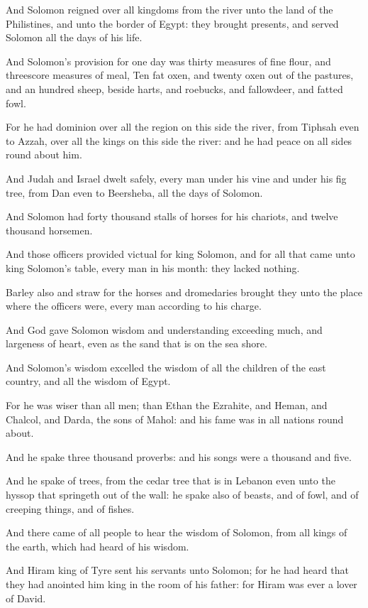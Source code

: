 \Verse And Solomon reigned over all kingdoms from the river unto the land of the Philistines, and unto the border of Egypt: they brought presents, and served Solomon all the days of his life.

\Verse And Solomon's provision for one day was thirty measures of fine flour, and threescore measures of meal, \Verse Ten fat oxen, and twenty oxen out of the pastures, and an hundred sheep, beside harts, and roebucks, and fallowdeer, and fatted fowl.

\Verse For he had dominion over all the region on this side the river, from Tiphsah even to Azzah, over all the kings on this side the river: and he had peace on all sides round about him.

\Verse And Judah and Israel dwelt safely, every man under his vine and under his fig tree, from Dan even to Beersheba, all the days of Solomon.

\Verse And Solomon had forty thousand stalls of horses for his chariots, and twelve thousand horsemen.

\Verse And those officers provided victual for king Solomon, and for all that came unto king Solomon's table, every man in his month: they lacked nothing.

\Verse Barley also and straw for the horses and dromedaries brought they unto the place where the officers were, every man according to his charge.

\Verse And God gave Solomon wisdom and understanding exceeding much, and largeness of heart, even as the sand that is on the sea shore.

\Verse And Solomon's wisdom excelled the wisdom of all the children of the east country, and all the wisdom of Egypt.

\Verse For he was wiser than all men; than Ethan the Ezrahite, and Heman, and Chalcol, and Darda, the sons of Mahol: and his fame was in all nations round about.

\Verse And he spake three thousand proverbs: and his songs were a thousand and five.

\Verse And he spake of trees, from the cedar tree that is in Lebanon even unto the hyssop that springeth out of the wall: he spake also of beasts, and of fowl, and of creeping things, and of fishes.

\Verse And there came of all people to hear the wisdom of Solomon, from all kings of the earth, which had heard of his wisdom.


\Chapter
\Verse And Hiram king of Tyre sent his servants unto Solomon; for he had heard that they had anointed him king in the room of his father: for Hiram was ever a lover of David.

